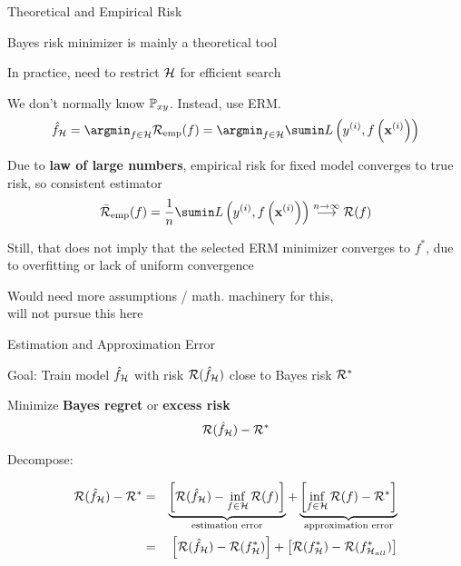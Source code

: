\documentclass[11pt,compress,t,notes=noshow, xcolor=table]{beamer}
\begin{document}
\begin{framei}[sep=M]{Theoretical and Empirical Risk}  
 

\item Bayes risk minimizer is mainly a theoretical tool
\item In practice, need to restrict $\mathcal{H}$ for efficient search %
\item We don't normally know $\mathbb{P}_{xy}$. Instead, use ERM. 
$$
{\hat f}_{\Hspace} = \argmin_{f \in \Hspace} \riskef = \argmin_{f \in \Hspace} \sumin \Lxyi
$$
\item Due to \textbf{law of large numbers}, empirical risk for fixed model converges to true risk, so consistent estimator
$$
\riskeb(f) = \frac{1}{n} \sumin \Lxyi \overset{n \to \infty}{\longrightarrow} \riskf 
$$
\item Still, that does not imply that the selected ERM minimizer converges to $f^{\ast}$, due to overfitting or lack of uniform convergence 
\item Would need more assumptions / math. machinery for this, \\
will not pursue this here 

\end{framei}



\begin{framei}[sep=L]{Estimation and Approximation Error} 

    \item Goal: Train model $\hat f_{\mathcal{H}}$ with risk $\mathcal{R}(\hat f_{\mathcal{H}})$ close to Bayes risk $\mathcal{R}^\ast$ \\
    \item Minimize \textbf{Bayes regret} or \textbf{excess risk}
$$
	\mathcal{R}(\hat f_{\mathcal{H}}) - \mathcal{R}^\ast
$$ 

\item Decompose: 

\begin{eqnarray*}
	\mathcal{R}(\hat f_{\mathcal{H}}) - \mathcal{R}^\ast &=& \underbrace{\left[\mathcal{R}(\hat f_{\mathcal{H}}) - \inf_{f \in \mathcal{H}} \mathcal{R}(f)\right]}_{\text{estimation error}} + \underbrace{\left[\inf_{f \in \mathcal{H}} \mathcal{R}(f) - \mathcal{R}^\ast\right]}_{\text{approximation error}} \\
    &=& \left[\mathcal{R}(\hat{f}_{\mathcal{H}}) - \mathcal{R}(f^{\ast}_{\mathcal{H}})\right] + \left[\mathcal{R}(f^{\ast}_{\mathcal{H}}) - \mathcal{R}(f^{\ast}_{\mathcal{H}_{all}}) \right] 
\end{eqnarray*}

\end{framei}
\end{document}
